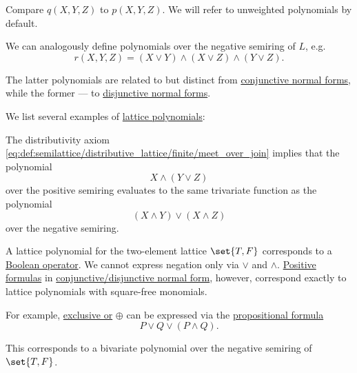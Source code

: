 \begin{remark}
  Compare \( q(X, Y, Z) \) to \( p(X, Y, Z) \). We will refer to unweighted polynomials by default.

  We can analogously define polynomials over the negative semiring of \( L \), e.g.
  \begin{equation*}
    r(X, Y, Z) = (X \vee Y) \wedge (X \vee Z) \wedge (Y \vee Z).
  \end{equation*}

  The latter polynomials are related to but distinct from \hyperref[def:cnf_and_dnf]{conjunctive normal forms}, while the former --- to \hyperref[def:cnf_and_dnf]{disjunctive normal forms}.
\end{remark}

\begin{example}\label{ex:lattice_polynomials}
  We list several examples of \hyperref[rem:lattice_polynomials]{lattice polynomials}:
  \begin{thmenum}
     The distributivity axiom \eqref{eq:def:semilattice/distributive_lattice/finite/meet_over_join} implies that the polynomial
    \begin{equation*}
      X \wedge (Y \vee Z)
    \end{equation*}
    over the positive semiring evaluates to the same trivariate function as the polynomial
    \begin{equation*}
      (X \wedge Y) \vee (X \wedge Z)
    \end{equation*}
    over the negative semiring.

     A lattice polynomial for the two-element lattice \( \set{ T, F } \) corresponds to a \hyperref[def:boolean_operator]{Boolean operator}. We cannot express negation only via \( \vee \) and \( \wedge \). \hyperref[def:positive_formula]{Positive formulas} in \hyperref[def:cnf_and_dnf]{conjunctive/disjunctive normal form}, however, correspond exactly to lattice polynomials with square-free monomials.

    For example, \hyperref[def:standard_boolean_operators]{exclusive or} \( \oplus \) can be expressed via the \hyperref[def:propositional_syntax/formula]{propositional formula}
    \begin{equation*}
      P \vee Q \vee (P \wedge Q).
    \end{equation*}

    This corresponds to a bivariate polynomial over the negative semiring of \( \set{ T, F } \).
  \end{thmenum}
\end{example}

